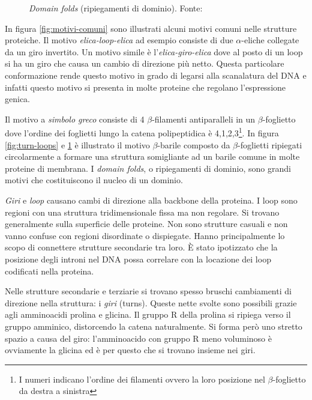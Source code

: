 {{\begin{figure}[!htb]
	\caption{\textit{Domain folds} (ripiegamenti di dominio). Fonte: \cite{moran2012principles}}
	\label{fig:domain-folds}
	\endminipage\hfill
	
\end{figure}

\par In figura \ref{fig:motivi-comuni} sono illustrati alcuni motivi comuni nelle strutture proteiche. 
Il motivo \textit{elica-loop-elica} ad esempio consiste di due $\alpha$-eliche collegate da un giro invertito. Un motivo simile è l'\textit{elica-giro-elica} dove al posto di un loop si ha un giro che causa un cambio di direzione più netto. Questa particolare conformazione rende questo motivo in grado di legarsi alla scanalatura del DNA e infatti questo motivo si presenta in molte proteine che regolano l'espressione genica.

\par Il motivo a \textit{simbolo greco} consiste di 4 $\beta$-filamenti antiparalleli in un $\beta$-foglietto dove l'ordine dei foglietti lungo la catena polipeptidica è 4,1,2,3\footnote{I numeri indicano l'ordine dei filamenti ovvero la loro posizione nel $\beta$-foglietto da destra a sinistra}. In figura \ref{fig:turn-loops} e \ref{fig:domain-folds} è illustrato il motivo $\beta$-barile composto da $\beta$-foglietti ripiegati circolarmente a formare una struttura somigliante ad un barile comune in molte proteine di membrana. I \textit{domain folds}, o ripiegamenti di dominio, sono grandi motivi che costituiscono il nucleo di un dominio.

\par \textit{Giri} e \textit{loop} causano cambi di direzione alla backbone della proteina. I loop sono regioni con una struttura tridimensionale fissa ma non regolare. Si trovano generalmente sulla superficie delle proteine. Non sono strutture casuali e non vanno confuse con regioni disordinate o dispiegate. Hanno principalmente lo scopo di connettere strutture secondarie tra loro. È stato ipotizzato che la posizione degli introni nel DNA possa correlare con la locazione dei loop codificati nella proteina\supercite{PSPwiki}.

\par Nelle strutture secondarie e terziarie si trovano spesso bruschi cambiamenti di direzione nella struttura: i \textit{giri} (turns). Queste nette svolte sono possibili grazie agli amminoacidi prolina e glicina. Il gruppo R della prolina si ripiega verso il gruppo amminico, distorcendo la catena naturalmente. Si forma però uno stretto spazio a causa del giro: l'amminoacido con gruppo R meno voluminoso è ovviamente la glicina ed è per questo che si trovano insieme nei giri.

}}
